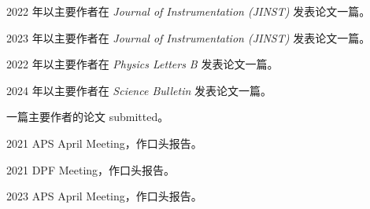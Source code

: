 \begin{achievements*}

  
  \begin{theachievements}[已发表论文]
    \item 2022 年以主要作者在 \emph{Journal of Instrumentation (JINST)} 发表论文一篇。
    \item 2023 年以主要作者在 \emph{Journal of Instrumentation (JINST)} 发表论文一篇。
    \item 2022 年以主要作者在 \emph{Physics Letters B} 发表论文一篇。
    \item 2024 年以主要作者在 \emph{Science Bulletin} 发表论文一篇。
  \end{theachievements}

  \begin{theachievements}[待发表期刊论文]
    \item 一篇主要作者的论文 submitted。
  \end{theachievements}


  \begin{theachievements}[口头报告]
    \item 2021 APS April Meeting，作口头报告。
    \item 2021 DPF Meeting，作口头报告。
    \item 2023 APS April Meeting，作口头报告。
  \end{theachievements}

\end{achievements*}